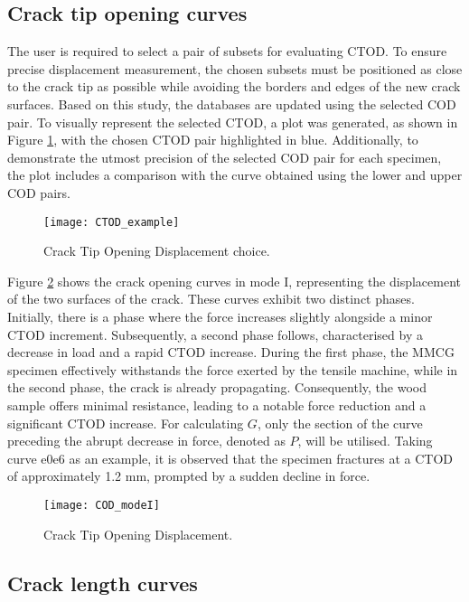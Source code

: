 \subsection{Crack tip opening curves}

The user is required to select a pair of subsets for evaluating CTOD. To ensure precise displacement measurement, the chosen subsets must be positioned as close to the crack tip as possible while avoiding the borders and edges of the new crack surfaces. Based on this study, the databases are updated using the selected COD pair. To visually represent the selected CTOD, a plot was generated, as shown in Figure \ref{fig:CTOD_example}, with the chosen CTOD pair highlighted in blue. Additionally, to demonstrate the utmost precision of the selected COD pair for each specimen, the plot includes a comparison with the curve obtained using the lower and upper COD pairs.

\begin{figure}[htp]
	\centering
	\texttt{[image: CTOD\_example]}
	\caption{Crack Tip Opening Displacement choice.}
	\label{fig:CTOD_example}
\end{figure}

Figure \ref{fig:COD_modeI} shows the crack opening curves in mode I, representing the displacement of the two surfaces of the crack. These curves exhibit two distinct phases. Initially, there is a phase where the force increases slightly alongside a minor CTOD increment. Subsequently, a second phase follows, characterised by a decrease in load and a rapid CTOD increase. During the first phase, the MMCG specimen effectively withstands the force exerted by the tensile machine, while in the second phase, the crack is already propagating. Consequently, the wood sample offers minimal resistance, leading to a notable force reduction and a significant CTOD increase.
For calculating $G$, only the section of the curve preceding the abrupt decrease in force, denoted as $P$, will be utilised. Taking curve e0e6 as an example, it is observed that the specimen fractures at a CTOD of approximately 1.2 mm, prompted by a sudden decline in force.

\begin{figure}[H]
	\centering
	\texttt{[image: COD\_modeI]}
	\caption{Crack Tip Opening Displacement.}
	\label{fig:COD_modeI}
\end{figure}

\subsection{Crack length curves}

